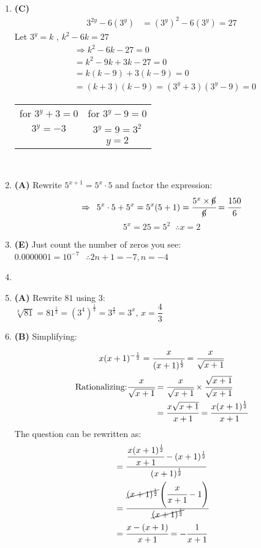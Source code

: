 \begin{multicols}{2}
\begin{enumerate}[label={\arabic*.}]
    \item \textbf{(C)} \begin{align*} 
        3^{2y} -6(3^y) & = (3^y)^2 - 6(3^y) = 27 
    \end{align*}
    Let $3^y = k$ , $k^2 - 6k = 27 $
    \begin{align*} 
            & \Rightarrow k^2 - 6k -27 = 0 \\
            & = k^2 - 9k + 3k - 27 = 0 \\
            & = k(k-9)+3(k-9) = 0 \\
        &= (k+3)(k-9) = (3^y + 3)(3^y - 9) = 0
    \end{align*}
    \begin{tabular}{c|c}
        for $3^y + 3 = 0$ & for $3^y - 9 = 0$ \\
        $3^y = -3 $& $3^y = 9 = 3^2$ \\
            & $y = 2$
    \end{tabular} \\

    \item \textbf{(A)} Rewrite \( 5^{x+1} = 5^x \cdot 5 \) and factor the expression: 
    \[\Rightarrow \hspace{5pt} 5^x \cdot 5 + 5^x = 5^x (5 + 1) = \cfrac{5^x \times \cancel{6}}{\cancel{6}} = \cfrac{150}{6}\]
    \[5^x = 25 = 5^2 \, \hspace{5pt} \therefore x = 2 \]

    \item \textbf{(E)} Just count the number of zeros you see: \\
    \( 0.0000001 = 10^{-7} \) \(\hspace{5pt}\therefore 2n + 1 = -7, n = -4 \)

    \item 
    \item \textbf{(A)} Rewrite \( 81 \) using \( 3 \): \\ 
    \(\sqrt[3]{81} = 81^{\frac{1}{3}} = (3^4)^{\frac{1}{3}} = 3^{\frac{4}{3}} = 3^x, \, x = \dfrac{4}{3}\)
    \item \textbf{(B)} Simplifying:    
    \[x(x+1)^{-\frac{1}{2}} = \cfrac{x}{(x+1)^{\frac{1}{2}}} = \cfrac{x}{\sqrt{x+1}}\]
    \begin{align*}
    \text{Rationalizing:} \cfrac{x}{\sqrt{x+1}} &= \cfrac{x}{\sqrt{x+1}} \times \cfrac{\sqrt{x+1}}{\sqrt{x+1}} \\
    &= \cfrac{x\sqrt{x+1}}{x+1} = \cfrac{x(x+1)^{\frac{1}{2}}}{x+1}
    \end{align*} 
    The question can be rewritten as: 
    \begin{align*} 
        &= \cfrac{\cfrac{x(x+1)^{\frac{1}{2}}}{x+1} - (x+1)^{\frac{1}{2}}}{(x+1)^{\frac{1}{2}}} \\
        &= \cfrac{\cancel{(x+1)^{\frac{1}{2}}}\left(\cfrac{x}{x+1} - 1\right)}{\cancel{(x+1)^{\frac{1}{2}}}} \\
        &= \cfrac{x - (x+1)}{x+1} = -\cfrac{1}{x+1}
    \end{align*}


\end{enumerate}
\end{multicols}
